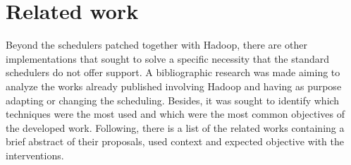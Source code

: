 
\section{Related work}
Beyond the schedulers patched together with Hadoop, there are other implementations that sought to solve a specific necessity that the standard schedulers do not offer support. A bibliographic research was made aiming to analyze the works already published involving Hadoop and having as purpose adapting or changing the scheduling. Besides, it was sought to identify which techniques were the most used and which were the most common objectives of the developed work. Following, there is a list of the related works containing a brief abstract of their proposals, used context and expected objective with the interventions.

